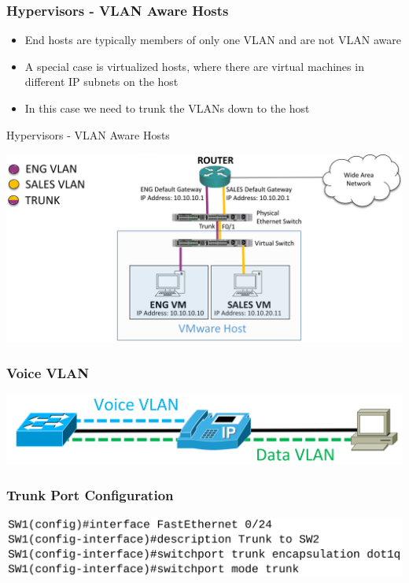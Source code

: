 \documentclass[pdflatex,compress,mathserif]{beamer}
\begin{document}
\begin{frame}
	\frametitle{Hypervisors - VLAN Aware Hosts}
	\begin{itemize}
		\item End hosts are typically members of only one VLAN and are not VLAN
aware
		\item A special case is virtualized hosts, where there are virtual machines in
different IP subnets on the host
		\item In this case we need to trunk the VLANs down to the host
	\end{itemize}
\end{frame}

\begin{frame}{Hypervisors - VLAN Aware Hosts}
	\begin{center}
		\includegraphics[width=\linewidth]{img/img24}
	\end{center}
\end{frame}

\begin{frame}
	\frametitle{Voice VLAN}
	\begin{center}
		\includegraphics[width=\linewidth]{img/img25}
	\end{center}
\end{frame}

\begin{frame}
	\frametitle{Trunk Port Configuration}
	\begin{center}
		\includegraphics[width=\linewidth]{img/img26}
	\end{center}
\end{frame}
\end{document}
